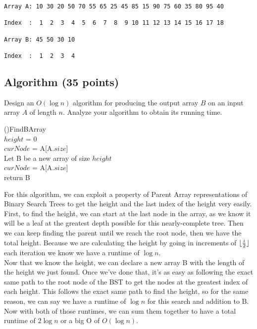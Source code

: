 \documentclass[11pt]{amsart}
\DeclarePairedDelimiter\floor{\lfloor}{\rfloor}
\begin{document}
\begin{verbatim}
Array A: 10 30 20 50 70 55 65 25 45 85 15 90 75 60 35 80 95 40

Index  :  1  2  3  4  5  6  7  8  9 10 11 12 13 14 15 16 17 18

Array B: 45 50 30 10

Index  :  1  2  3  4
\end{verbatim}
\newpage
\subsection*{Algorithm (35 points)}

Design an $O(\log n)$ algorithm for producing the output array $B$
on an input array $A$ of length $n$. Analyze your algorithm to obtain
its running time.\\
\begin{algorithm}[H]
    \Fn(){FindBArray}{
    \SetAlgoLined
    \SetNoFillComment
    \DontPrintSemicolon
        \\
        $height$ = 0\\
        $curNode$ = A[A.$size$]\\
        Let B be a new array of size $height$\\
        $curNode$ = A[A.$size$]\\
        return B
    }
    \end{algorithm}
\bigskip
For this algorithm, we can exploit a property of Parent Array representations of Binary Search Trees to get the height and the last index of the height very easily. First, to find the height, we can start at the last node in the array, as we know it will be a leaf at the greatest depth possible for this nearly-complete tree. Then we can keep finding the parent until we reach the root node, then we have the total height. Because we are calculating the height by going in increments of $\floor{\frac{i}{2}}$ each iteration we know we have a runtime of $\log n$.\\
Now that we know the height, we can declare a new array B with the length of the height we just found. Once we've done that, it's as easy as following the exact same path to the root node of the BST to get the nodes at the greatest index of each height. This follows the exact same path to find the height, so for the same reason, we can say we have a runtime of $\log n$ for this search and addition to B.\\
Now with both of those runtimes, we can sum them together to have a total runtime of $2 \log n$ or a big O of $O(\log n)$.
\end{document}
